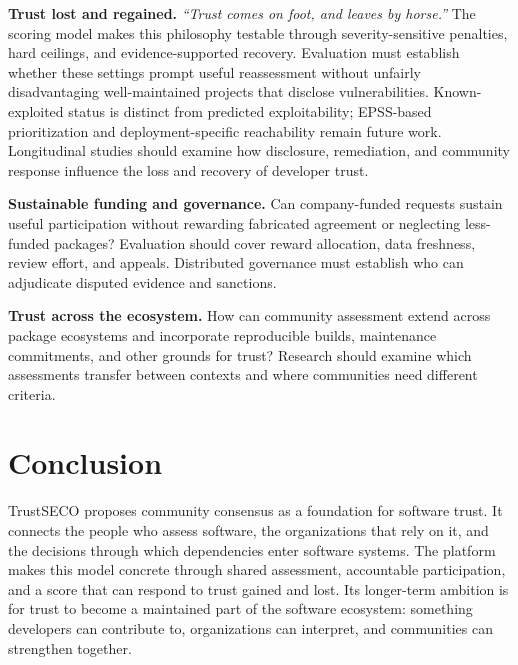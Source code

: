 \documentclass[10pt,conference]{IEEEtran}
\begin{document}
\textbf{Trust lost and regained.} \emph{``Trust comes on foot, and leaves by horse.''} The scoring model makes this philosophy testable through severity-sensitive penalties, hard ceilings, and evidence-supported recovery. Evaluation must establish whether these settings prompt useful reassessment without unfairly disadvantaging well-maintained projects that disclose vulnerabilities. Known-exploited status is distinct from predicted exploitability; EPSS-based prioritization and deployment-specific reachability remain future work. Longitudinal studies should examine how disclosure, remediation, and community response influence the loss and recovery of developer trust.

\textbf{Sustainable funding and governance.} Can company-funded requests sustain useful participation without rewarding fabricated agreement or neglecting less-funded packages? Evaluation should cover reward allocation, data freshness, review effort, and appeals. Distributed governance must establish who can adjudicate disputed evidence and sanctions.

\textbf{Trust across the ecosystem.} How can community assessment extend across package ecosystems and incorporate reproducible builds, maintenance commitments, and other grounds for trust? Research should examine which assessments transfer between contexts and where communities need different criteria.

\section{Conclusion}
TrustSECO proposes community consensus as a foundation for software trust. It connects the people who assess software, the organizations that rely on it, and the decisions through which dependencies enter software systems. The platform makes this model concrete through shared assessment, accountable participation, and a score that can respond to trust gained and lost. Its longer-term ambition is for trust to become a maintained part of the software ecosystem: something developers can contribute to, organizations can interpret, and communities can strengthen together.



\end{document}
